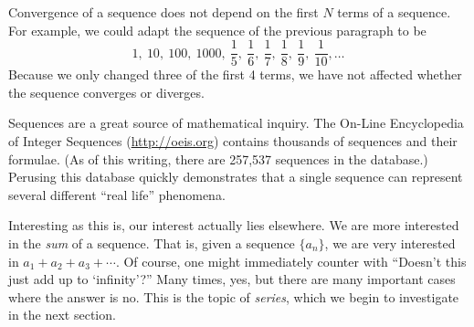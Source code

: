Convergence of a sequence does not depend on the first $N$ terms of a sequence.  For example, we could adapt the sequence of the previous paragraph to be
\[
 1,\ 10,\ 100,\ 1000,\ \frac15,\ \frac16,\ \frac17,\ \frac18,\ \frac19,\ \frac1{10},
 \dotsc
\]
Because we only changed three of the first 4 terms, we have not affected whe\-ther the sequence converges or diverges.

Sequences are a great source of mathematical inquiry. The On-Line Encyclopedia of Integer Sequences (\url{http://oeis.org}) contains thousands of sequences and their formulae. (As of this writing, there are 257,537 sequences in the database.) Perusing this database quickly demonstrates that a single sequence can represent several different ``real life'' phenomena. 

Interesting as this is, our interest actually lies elsewhere. We are more interested in the \emph{sum} of a sequence. That is, given a sequence $\{a_n\}$, we are very interested in $a_1+a_2+a_3+\dotsb$. Of course, one might immediately counter with ``Doesn't this just add up to `infinity'?'' Many times, yes, but there are many important cases where the answer is no. This is the topic of \emph{series}, which we begin to investigate in the next section.

